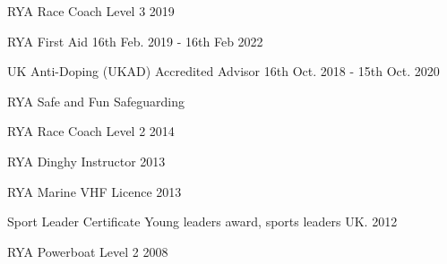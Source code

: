 


\begin{cvskills}

  \cvskill 
    {RYA Race Coach Level 3} %
    {2019} %

  \cvskill 
    {RYA First Aid} %
    {16th Feb. 2019 - 16th Feb 2022} %

 
  \cvskill
    {UK Anti-Doping (UKAD) Accredited Advisor} %
    {16th Oct. 2018 - 15th Oct. 2020} %
    

 \cvskill
    {RYA Safe and Fun Safeguarding} %
    {}

  \cvskill
    {RYA Race Coach Level 2} %
    {2014}

 
   \cvskill
    {RYA Dinghy Instructor} %
    {2013}


  \cvskill
    {RYA Marine VHF Licence} %
    {2013}


  \cvskill
    {Sport Leader Certificate} %
    {Young leaders award, sports leaders UK. 2012}

 
   \cvskill
    {RYA Powerboat Level 2} %
    {2008}


 \end{cvskills}